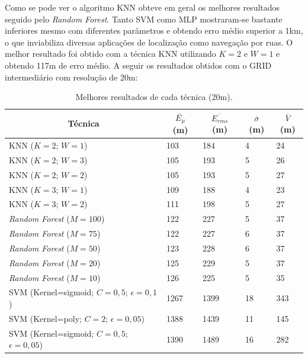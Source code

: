 \documentclass[12pt]{article}
\begin{document}
        Como se pode ver o algoritmo KNN obteve em geral os melhores resultados seguido pelo \textit{Random Forest}. Tanto SVM como MLP mostraram-se bastante inferiores mesmo com diferentes parâmetros e obtendo erro médio superior a 1km, o que inviabiliza diversas aplicações de localização como navegação por ruas. O melhor resultado foi obtido com a técnica KNN utilizando $K = 2$ e $W = 1$ e obtendo 117m de erro médio. A seguir os resultados obtidos com o GRID intermediário com resolução de 20m: 
        
        \begin{center}
        \begin{longtable}{|l|l|l|l|l|}
        \caption{Melhores resultados de cada técnica (20m).} 
        \label{table:resultsTop520m} \\
        \hline \multicolumn{1}{|c|}{\textbf{Técnica}} & \multicolumn{1}{c|}{\textbf{$\overline{E_{\mu}}$ (m)}} & \multicolumn{1}{c|}{\textbf{$\overline{E_{rms}}$ (m)}} & \multicolumn{1}{c|}{\textbf{$\overline{\sigma}$ (m)}} & \multicolumn{1}{c|}{\textbf{$\overline{V}$ (m)}} \\ \hline
        \endfirsthead
        \hline
        \endlastfoot
        KNN ($K=2$; $W=1$) & 103 & 184 & 4 & 24 \\
        KNN ($K=2$; $W=3$) & 105 & 193 & 5 & 26 \\
        KNN ($K=2$; $W=2$) & 105 & 193 & 5 & 27 \\
        KNN ($K=3$; $W=1$) & 109 & 188 & 4 & 23 \\
        KNN ($K=3$; $W=2$) & 111 & 198 & 5 & 27 \\
        \hline
        \textit{Random Forest} ($M=100$) & 122 & 227 & 5 & 37 \\
        \textit{Random Forest} ($M=75$) & 122 & 227 & 6 & 37 \\
        \textit{Random Forest} ($M=50$) & 123 & 228 & 6 & 37 \\
        \textit{Random Forest} ($M=20$) & 125 & 229 & 5 & 37 \\
        \textit{Random Forest} ($M=10$) & 126 & 225 & 5 & 35 \\
        \hline
        SVM (Kernel=sigmoid; $C=0,5$; $\epsilon=0,1$) & 1267 & 1399 & 18 & 343 \\
        SVM (Kernel=poly; $C=2$; $\epsilon=0,05$) & 1388 & 1439 & 11 & 145 \\
        SVM (Kernel=sigmoid; $C=0,5$; $\epsilon=0,05$) & 1390 & 1489 & 16 & 282 \\

\end{longtable}
\end{center}
\end{document}

